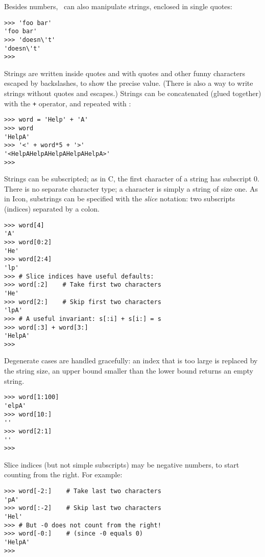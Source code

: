 Besides numbers, \Python\ can also manipulate strings, enclosed in single
quotes:
\begin{code}\begin{verbatim}
>>> 'foo bar'
'foo bar'
>>> 'doesn\'t'
'doesn\'t'
>>> 
\end{verbatim}\end{code}
Strings are written inside quotes and with quotes and other funny
characters escaped by backslashes, to show the precise value.
(There is also a way to write strings without quotes and escapes.)
Strings can be concatenated (glued together) with the
{\tt +}
operator, and repeated with
{\tt *}:
\begin{code}\begin{verbatim}
>>> word = 'Help' + 'A'
>>> word
'HelpA'
>>> '<' + word*5 + '>'
'<HelpAHelpAHelpAHelpAHelpA>'
>>> 
\end{verbatim}\end{code}
Strings can be subscripted; as in C, the first character of a string has
subscript 0.
There is no separate character type; a character is simply a string of
size one.
As in Icon, substrings can be specified with the
{\it slice}
notation: two subscripts (indices) separated by a colon.
\begin{code}\begin{verbatim}
>>> word[4]
'A'
>>> word[0:2]
'He'
>>> word[2:4]
'lp'
>>> # Slice indices have useful defaults:
>>> word[:2]    # Take first two characters
'He'
>>> word[2:]    # Skip first two characters
'lpA'
>>> # A useful invariant: s[:i] + s[i:] = s
>>> word[:3] + word[3:]
'HelpA'
>>> 
\end{verbatim}\end{code}
Degenerate cases are handled gracefully: an index that is too large is
replaced by the string size, an upper bound smaller than the lower bound
returns an empty string.
\begin{code}\begin{verbatim}
>>> word[1:100]
'elpA'
>>> word[10:]
''
>>> word[2:1]
''
>>> 
\end{verbatim}\end{code}
Slice indices (but not simple subscripts) may be negative numbers, to
start counting from the right.
For example:
\begin{code}\begin{verbatim}
>>> word[-2:]    # Take last two characters
'pA'
>>> word[:-2]    # Skip last two characters
'Hel'
>>> # But -0 does not count from the right!
>>> word[-0:]    # (since -0 equals 0)
'HelpA'
>>> 
\end{verbatim}\end{code}

